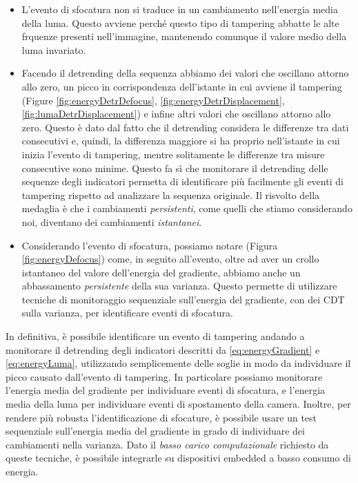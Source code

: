 \begin{itemize}
	\item L'evento di sfocatura non si traduce in un cambiamento nell'energia media della luma.
	Questo avviene perch\'e questo tipo di tampering abbatte le alte frquenze presenti nell'immagine, mantenendo comunque il valore medio della luma invariato.
	\item Facendo il detrending della sequenza abbiamo dei valori che oscillano attorno allo zero, un picco in corrispondenza dell'istante in cui avviene il tampering (Figure \ref{fig:energyDetrDefocus}, \ref{fig:energyDetrDisplacement}, \ref{fig:lumaDetrDisplacement}) e infine altri valori che oscillano attorno allo zero.
	Questo \`e dato dal fatto che il detrending considera le differenze tra dati consecutivi e, quindi, la differenza maggiore si ha proprio nell'istante in cui inizia l'evento di tampering, mentre solitamente le differenze tra misure consecutive sono minime. 
	Questo fa s\`i che monitorare il detrending delle sequenze degli indicatori permetta di identificare pi\`u facilmente gli eventi di tampering rispetto ad analizzare la sequenza originale.
	Il risvolto della medaglia \`e che i cambiamenti \textit{persistenti}, come quelli che stiamo considerando noi, diventano dei cambiamenti \textit{istantanei}.
	\item Considerando l'evento di sfocatura, possiamo notare (Figura \ref{fig:energyDefocus}) come, in seguito all'evento, oltre ad aver un crollo istantaneo del valore dell'energia del gradiente, abbiamo anche un abbassamento \textit{persistente} della sua varianza.
	Questo permette di utilizzare tecniche di monitoraggio sequenziale sull'energia del gradiente, con dei CDT sulla varianza, per identificare eventi di sfocatura.
\end{itemize}
In definitiva, \`e possibile identificare un evento di tampering andando a monitorare il detrending degli indicatori descritti da \eqref{eq:energyGradient} e \eqref{eq:energyLuma}, utilizzando semplicemente delle soglie in modo da individuare il picco causato dall'evento di tampering.
In particolare possiamo monitorare l'energia media del gradiente per individuare eventi di sfocatura, e l'energia media della luma per individuare eventi di spostamento della camera.
Inoltre, per rendere pi\`u robusta l'identificazione di sfocature, \`e possibile usare un test sequenziale sull'energia media del gradiente in grado di individuare dei cambiamenti nella varianza.
Dato il \textit{basso carico computazionale} richiesto da queste tecniche, \`e possibile integrarle su dispositivi embedded a basso consumo di energia.\\
